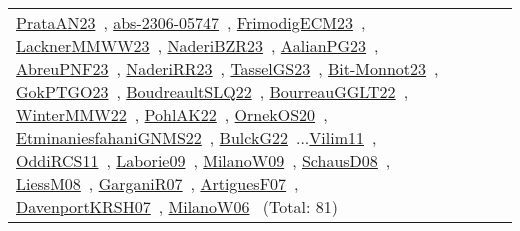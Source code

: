 {\begin{longtable}{p{3cm}r>{\raggedright\arraybackslash}p{6cm}>{\raggedright\arraybackslash}p{6cm}>{\raggedright\arraybackslash}p{8cm}}
\href{../works/PrataAN23.pdf}{PrataAN23}~\cite{PrataAN23}, \href{../works/abs-2306-05747.pdf}{abs-2306-05747}~\cite{abs-2306-05747}, \href{../works/FrimodigECM23.pdf}{FrimodigECM23}~\cite{FrimodigECM23}, \href{../works/LacknerMMWW23.pdf}{LacknerMMWW23}~\cite{LacknerMMWW23}, \href{../works/NaderiBZR23.pdf}{NaderiBZR23}~\cite{NaderiBZR23}, \href{../works/AalianPG23.pdf}{AalianPG23}~\cite{AalianPG23}, \href{../works/AbreuPNF23.pdf}{AbreuPNF23}~\cite{AbreuPNF23}, \href{../works/NaderiRR23.pdf}{NaderiRR23}~\cite{NaderiRR23}, \href{../works/TasselGS23.pdf}{TasselGS23}~\cite{TasselGS23}, \href{../works/Bit-Monnot23.pdf}{Bit-Monnot23}~\cite{Bit-Monnot23}, \href{../works/GokPTGO23.pdf}{GokPTGO23}~\cite{GokPTGO23}, \href{../works/BoudreaultSLQ22.pdf}{BoudreaultSLQ22}~\cite{BoudreaultSLQ22}, \href{../works/BourreauGGLT22.pdf}{BourreauGGLT22}~\cite{BourreauGGLT22}, \href{../works/WinterMMW22.pdf}{WinterMMW22}~\cite{WinterMMW22}, \href{../works/PohlAK22.pdf}{PohlAK22}~\cite{PohlAK22}, \href{../works/OrnekOS20.pdf}{OrnekOS20}~\cite{OrnekOS20}, \href{../works/EtminaniesfahaniGNMS22.pdf}{EtminaniesfahaniGNMS22}~\cite{EtminaniesfahaniGNMS22}, \href{../works/BulckG22.pdf}{BulckG22}~\cite{BulckG22}...\href{../works/Vilim11.pdf}{Vilim11}~\cite{Vilim11}, \href{../works/OddiRCS11.pdf}{OddiRCS11}~\cite{OddiRCS11}, \href{../works/Laborie09.pdf}{Laborie09}~\cite{Laborie09}, \href{../works/MilanoW09.pdf}{MilanoW09}~\cite{MilanoW09}, \href{../works/SchausD08.pdf}{SchausD08}~\cite{SchausD08}, \href{../works/LiessM08.pdf}{LiessM08}~\cite{LiessM08}, \href{../works/GarganiR07.pdf}{GarganiR07}~\cite{GarganiR07}, \href{../works/ArtiguesF07.pdf}{ArtiguesF07}~\cite{ArtiguesF07}, \href{../works/DavenportKRSH07.pdf}{DavenportKRSH07}~\cite{DavenportKRSH07}, \href{../works/MilanoW06.pdf}{MilanoW06}~\cite{MilanoW06} (Total: 81)\\

\end{longtable}}
